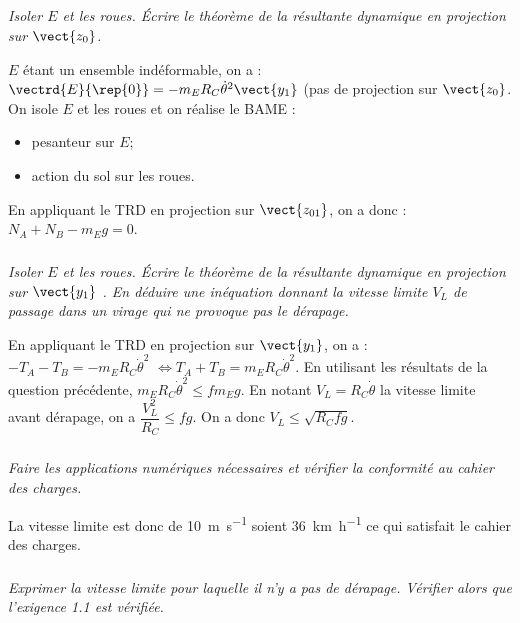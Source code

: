 \begin{multicols}{2}
\ifnormal
\subparagraph{}\textit{Isoler $E$ et les roues. Écrire le théorème de la résultante dynamique en projection sur $\vect{z_0}$.}%
\else
\fi
\ifprof
\begin{corrige}
$E$ étant un ensemble indéformable, on a : $\vectrd{E}{\rep{0}}=-m_E R_C\dot{\theta}^2\vect{y_1}$ (pas de projection sur $\vect{z_0}$. 
On isole $E$ et les roues  et on réalise le BAME : 
\begin{itemize}
\item pesanteur sur $E$;
\item action du sol sur les roues.
\end{itemize}

En appliquant le TRD en projection sur $\vect{z_{01}}$, on a donc :
$N_A+N_B-m_E g = 0$. 


\end{corrige}
\else
\fi

\ifnormal
\subparagraph{}\textit{Isoler $E$ et les roues. Écrire le théorème de la résultante dynamique en projection sur $\vect{y_1}$ . En déduire une inéquation donnant la vitesse limite $V_L$ de passage dans un virage qui ne provoque pas le dérapage.}
\else
\fi

\ifprof

\begin{corrige}
En appliquant le TRD en projection sur $\vect{y_{1}}$, on a : $-T_A-T_B = -m_E R_C\dot{\theta}^2$ $\Leftrightarrow T_A+T_B = m_E R_C\dot{\theta}^2$. En utilisant les résultats de la question précédente, $m_E R_C\dot{\theta}^2 \leq fm_E g $. En notant $V_L=R_C\dot{\theta}$ la vitesse limite avant dérapage, on a $ \dfrac{V_L^2}{R_C} \leq f  g $.
On a donc $V_L \leq \sqrt{R_Cfg}$.
\end{corrige}
\else
\fi

\ifnormal
\subparagraph{}\textit{Faire les applications numériques nécessaires et vérifier la conformité au cahier des charges.}
\else
\fi
\ifprof
\begin{corrige}
La vitesse limite est donc de \SI{10}{m.s^{-1}} soient \SI{36}{km.h^{-1}} ce qui satisfait le cahier des charges. 
\end{corrige}
\else
\fi

\iftdifficile
\subparagraph{}\textit{Exprimer la vitesse limite pour laquelle il n'y a pas de dérapage. Vérifier alors que l'exigence 1.1 est vérifiée.}

\else
\fi



\end{multicols}
